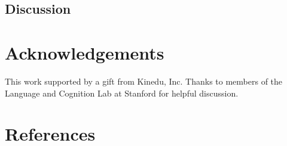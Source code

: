 \documentclass[10pt, letterpaper]{article}
\begin{document}
\subsection{Discussion}\label{discussion}

\section{Acknowledgements}\label{acknowledgements}

This work supported by a gift from Kinedu, Inc. Thanks to members of the
Language and Cognition Lab at Stanford for helpful discussion.

\section{References}\label{references}

\small
\end{document}
